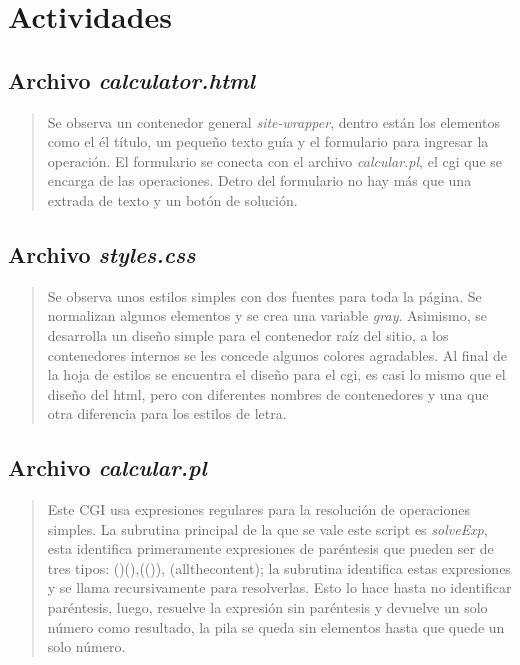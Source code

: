 \documentclass{article}
\begin{document}
	\section{Actividades}

  \subsection{Archivo \textit{calculator.html}}

  

  \begin{quote}
    Se observa un contenedor general \textit{site-wrapper}, dentro están los elementos como el él título, un pequeño texto guía y el formulario para ingresar la operación. El formulario se conecta con el archivo \textit{calcular.pl}, el cgi que se encarga de las operaciones. Detro del formulario no hay más que una extrada de texto y un botón de solución.
  \end{quote}

  \subsection{Archivo \textit{styles.css}}

  

  \begin{quote}
    Se observa unos estilos simples con dos fuentes para toda la página. Se normalizan algunos elementos y se crea una variable \textit{gray}. Asimismo, se desarrolla un diseño simple para el contenedor raíz del sitio, a los contenedores internos se les concede algunos colores agradables. Al final de la hoja de estilos se encuentra el diseño para el cgi, es casi lo mismo que el diseño del html, pero con diferentes nombres de contenedores y una que otra diferencia para los estilos de letra.
  \end{quote}

  \subsection{Archivo \textit{calcular.pl}}

  

  \begin{quote}
    Este CGI usa expresiones regulares para la resolución de operaciones simples. La subrutina principal de la que se vale este script es \textit{solveExp}, esta identifica primeramente expresiones de paréntesis que pueden ser de tres tipos: ()(),(()), (allthecontent); la subrutina identifica estas expresiones y se llama recursivamente para resolverlas. Esto lo hace hasta no identificar paréntesis, luego, resuelve la expresión sin paréntesis y devuelve un solo número como resultado, la pila se queda sin elementos hasta que quede un solo número.
  \end{quote}
\end{document}
